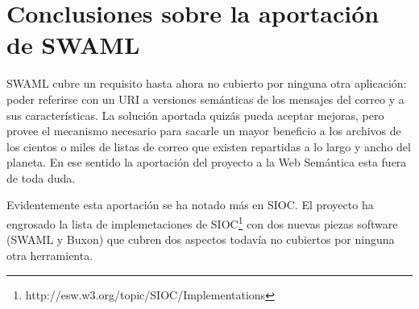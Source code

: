 
\section{Conclusiones sobre la aportación de SWAML}

SWAML cubre un requisito hasta ahora no cubierto por ninguna otra aplicación:
poder referirse con un URI a versiones semánticas de los mensajes del correo 
y a sus características. La solución aportada quizás pueda aceptar mejoras,
pero provee el mecanismo necesario para sacarle un mayor beneficio a los
archivos de los cientos o miles de listas de correo que existen repartidas a
lo largo y ancho del planeta. En ese sentido la aportación del proyecto a la
Web Semántica esta fuera de toda duda.

Evidentemente esta aportación se ha notado más en SIOC. El proyecto ha
engrosado la lista de implemetaciones de
SIOC\footnote{\url{}http://esw.w3.org/topic/SIOC/Implementations} con dos
nuevas piezas software (SWAML y Buxon) que cubren dos aspectos todavía no
cubiertos por ninguna otra herramienta.
